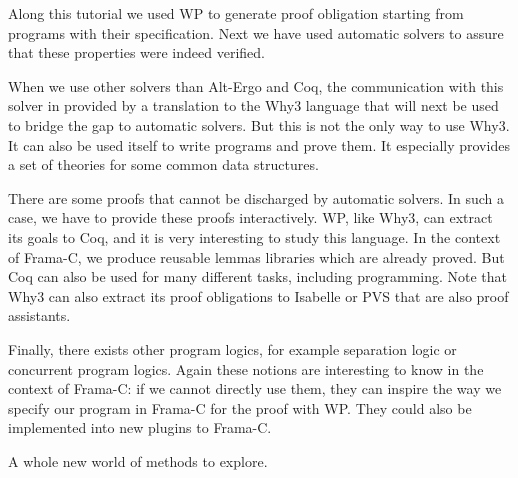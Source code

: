 

Along this tutorial we used WP to generate proof obligation starting
from programs with their specification. Next we have used automatic
solvers to assure that these properties were indeed verified.

When we use other solvers than Alt-Ergo and Coq, the communication with
this solver in provided by a translation to the Why3 language that will
next be used to bridge the gap to automatic solvers. But this is not the
only way to use Why3. It can also be used itself to write programs and
prove them. It especially provides a set of theories for some common
data structures.

There are some proofs that cannot be discharged by automatic solvers. In
such a case, we have to provide these proofs interactively. WP, like
Why3, can extract its goals to Coq, and it is very interesting to study
this language. In the context of Frama-C, we produce reusable lemmas
libraries which are already proved. But Coq can also be used for many
different tasks, including programming. Note that Why3 can also extract
its proof obligations to Isabelle or PVS that are also proof assistants.

Finally, there exists other program logics, for example separation logic
or concurrent program logics. Again these notions are interesting to know
in the context of Frama-C: if we cannot directly use them, they can
inspire the way we specify our program in Frama-C for the proof with WP.
They could also be implemented into new plugins to Frama-C.

A whole new world of methods to explore.
